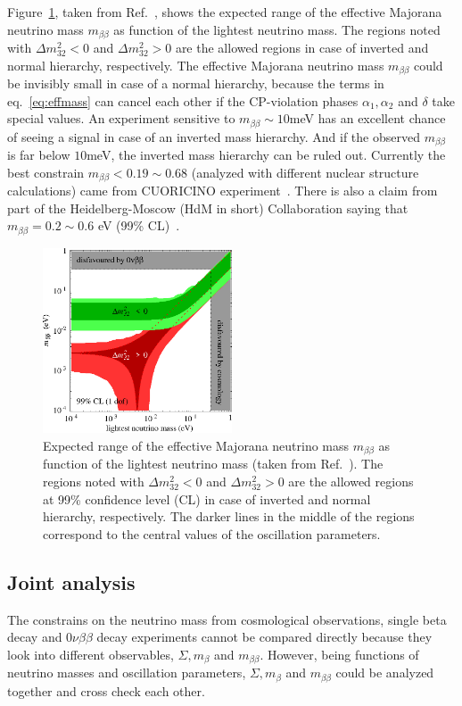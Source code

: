 Figure~\ref{fig:m2bVSlightest}, taken from Ref.~\cite{Str05}, shows the expected range of the effective Majorana neutrino mass $m_{\beta\beta}$ as function of the lightest neutrino mass. The regions noted with $\Delta m^{2}_{32}<0$ and $\Delta m^{2}_{32}>0$ are the allowed regions in case of inverted and normal hierarchy, respectively. The effective Majorana neutrino mass $m_{\beta\beta}$ could be invisibly small in case of a normal hierarchy, because the terms in eq.~\ref{eq:effmass} can cancel each other if the CP-violation phases $\alpha_{1}, \alpha_{2}$ and $\delta$ take special values. An experiment sensitive to $ m_{\beta\beta} \sim 10$meV has an excellent chance of seeing a signal in case of an inverted mass hierarchy. And if the observed $m_{\beta\beta}$ is far below $10$meV, the inverted mass hierarchy can be ruled out. Currently the best constrain $m_{\beta\beta}<0.19 \sim 0.68$ (analyzed with different nuclear structure calculations) came from CUORICINO experiment~\cite{Cuo08}. There is also a claim from part of the Heidelberg-Moscow (HdM in short) Collaboration saying that $m_{\beta\beta} = 0.2 \sim 0.6$ eV (99\% CL)~\cite{Hei04}.
\begin{figure}[tbhp]
  \centering
  \includegraphics[width=0.5\textwidth]{m2bVSlightest.eps}  
  \caption{Expected range of the effective Majorana neutrino mass     $m_{\beta\beta}$ as function of the lightest neutrino mass (taken     from Ref.~\cite{Str05}). The regions noted with $\Delta     m^{2}_{32}<0$ and $\Delta m^{2}_{32}>0$ are the allowed regions at     99\% confidence level (CL) in case of inverted and normal     hierarchy, respectively. The darker lines in the middle of the     regions correspond to the central values of the oscillation     parameters.}
  \label{fig:m2bVSlightest}
\end{figure}

\subsection{Joint analysis}
\label{sec:joian}
The constrains on the neutrino mass from cosmological observations, single beta decay and $0\nu\beta\beta$ decay experiments cannot be compared directly because they look into different observables, $\Sigma, m_{\beta}$ and $m_{\beta\beta}$. However, being functions of neutrino masses and oscillation parameters, $\Sigma, m_{\beta}$ and $m_{\beta\beta}$ could be analyzed together and cross check each other. 

